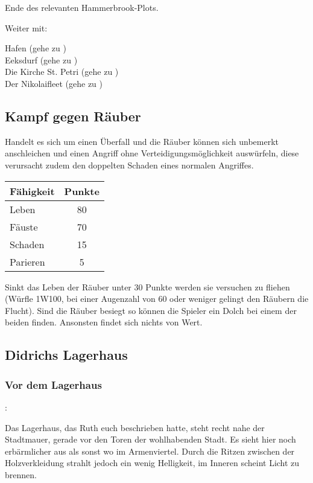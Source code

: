 Ende des relevanten Hammerbrook-Plots.

Weiter mit:

Hafen (gehe zu \blue{\ref{Hafen}}) \\
Eeksdurf (gehe zu \blue{\ref{xd}}) \\
Die Kirche St. Petri (gehe zu \blue{\ref{Petri}}) \\
Der Nikolaifleet (gehe zu \blue{\ref{Fleet}}) \\

\subsection*{Kampf gegen Räuber}
\label{kampf2}

Handelt es sich um einen Überfall und die Räuber können sich unbemerkt anschleichen und einen Angriff ohne Verteidigungsmöglichkeit auswürfeln, diese verursacht zudem den doppelten Schaden eines normalen Angriffes.

\begin{center}
  \begin{tabular}{lc}
    \toprule
    Fähigkeit & Punkte \\
    \midrule
    Leben & 80 \\
    Fäuste & 70 \\
    Schaden & 15 \\
    Parieren & 5 \\
    \bottomrule
  \end{tabular}
\end{center}

Sinkt das Leben der Räuber unter 30 Punkte werden sie versuchen zu fliehen (Würfle 1W100, bei einer Augenzahl von 60 oder weniger gelingt den Räubern die Flucht).
Sind die Räuber besiegt so können die Spieler ein Dolch bei einem der beiden finden. Ansonsten findet sich nichts von Wert.

\subsection*{Didrichs Lagerhaus}
\label{Lagerhaus}

\subsubsection{Vor dem Lagerhaus}

:

Das Lagerhaus, das Ruth euch beschrieben hatte, steht recht nahe der Stadtmauer, gerade vor den Toren der wohlhabenden Stadt. Es sieht hier noch erbärmlicher aus als sonst wo im Armenviertel. Durch die Ritzen zwischen der Holzverkleidung strahlt jedoch ein wenig Helligkeit, im Inneren scheint Licht zu brennen.


